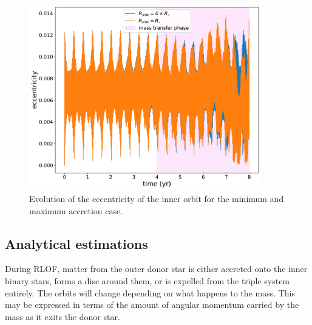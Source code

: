 \begin{figure}[H]
    \centering
    \includegraphics[width=0.9\textwidth]{Thesis/graphs/accretion_case/accretion_inner_ecc.pdf}
    \caption{Evolution of the eccentricity of the inner orbit for the minimum and maximum accretion case.}
    \label{fig:accretion_inner_ecc}
\end{figure}

\subsection{Analytical estimations}

During RLOF, matter from the outer donor star is either accreted onto the inner binary stars, forms a disc around them, or is expelled from the triple system entirely. The orbits will change depending on what happens to the mass. This may be expressed in terms of the amount of angular momentum carried by the mass as it exits the donor star.

